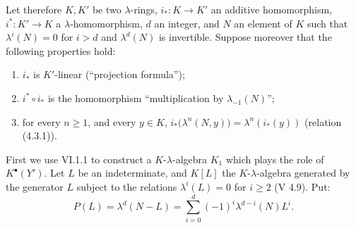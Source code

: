 Let therefore \(K,K'\) be two \(\lambda\)-rings, \(i_*:K\to K'\) an additive homomorphism, \(i^*:K'\to K\) a \(\lambda\)-homomorphism, \(d\) an integer, and \(N\) an element of \(K\) such that \(\lambda^i(N)=0\) for \(i>d\) and \(\lambda^d(N)\) is invertible. Suppose moreover that the following properties hold:
\begin{enumerate}[label=\roman*)]
\item \(i_*\) is \(K'\)-linear (``projection formula'');
\item \(i^*\circ i_*\) is the homomorphism ``multiplication by \(\lambda_{-1}(N)\)'';
\item for every \(n\ge1\), and every \(y\in K\), \(i_*\bigl(\lambda^n(N,y)\bigr)=\lambda^n(i_*(y))\) (relation (4.3.1)).
\end{enumerate}

First we use VI.1.1 to construct a \(K\)-\(\lambda\)-algebra \(K_1\) which plays the role of \(K^{\bullet}(Y')\). Let \(L\) be an indeterminate, and \(K[L]\) the \(K\)-\(\lambda\)-algebra generated by the generator \(L\) subject to the relations \(\lambda^i(L)=0\) for \(i\ge2\) (V 4.9). Put:
\[
  P(L)=\lambda^d(N-L)=\sum_{i=0}^{d}(-1)^i\lambda^{d-i}(N)L^i.
\]
